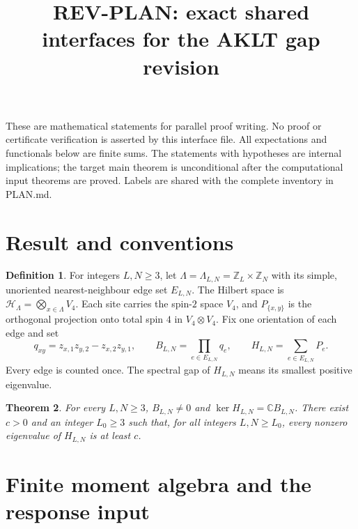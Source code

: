 \documentclass[11pt,reqno]{amsart}
\title{REV-PLAN: exact shared interfaces for the AKLT gap revision}
\date{}
\newtheorem{theorem}{Theorem}[section]
\theoremstyle{definition}
\newtheorem{definition}[theorem]{Definition}
\theoremstyle{remark}
\begin{document}
\maketitle
\noindent These are mathematical statements for parallel proof writing.
No proof or certificate verification is asserted by this interface file.
All expectations and functionals below are finite sums.
The statements with hypotheses are internal implications; the target
main theorem is unconditional after the computational input theorems
are proved. Labels are shared with the complete inventory in PLAN.md.




\section{Result and conventions}

\begin{definition}\label{d:model}
For integers \(L,N\ge3\), let \(\Lambda=\Lambda_{L,N}=\mathbb Z_L\times\mathbb Z_N\)
with its simple, unoriented nearest-neighbour edge set \(E_{L,N}\).
The Hilbert space is \(\mathcal H_\Lambda=\bigotimes_{x\in\Lambda}V_4\).
Each site carries the spin-\(2\) space \(V_4\), and \(P_{\{x,y\}}\)
is the orthogonal projection onto total spin \(4\) in \(V_4\otimes V_4\).
Fix one orientation of each edge and set
\[
 q_{xy}=z_{x,1}z_{y,2}-z_{x,2}z_{y,1},\qquad
 B_{L,N}=\prod_{e\in E_{L,N}}q_e,\qquad
 H_{L,N}=\sum_{e\in E_{L,N}}P_e.
\]
Every edge is counted once. The spectral gap of \(H_{L,N}\) means its
smallest positive eigenvalue.
\end{definition}

\begin{theorem}\label{t:main}
For every \(L,N\ge3\), \(B_{L,N}\ne0\) and
\(\ker H_{L,N}=\mathbb C B_{L,N}\).
There exist \(c>0\) and an integer \(L_0\ge3\) such that, for all
integers \(L,N\ge L_0\), every nonzero eigenvalue of \(H_{L,N}\)
is at least \(c\).
\end{theorem}


\section{Finite moment algebra and the response input}
\end{document}
